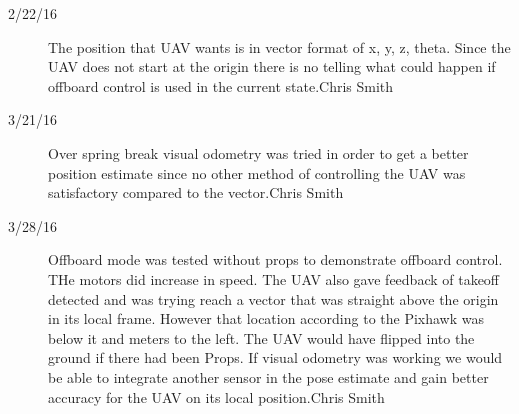 \begin{description}
\item [2/22/16]  The position that UAV wants is in vector format of x, y, z, theta. Since the UAV does not start at the origin there is no telling what could happen if offboard control is used in the current state.\hfill{Chris Smith}

\item [3/21/16]  Over spring break visual odometry was tried in order to get a better position estimate since no other method of controlling the UAV was satisfactory compared to the vector.\hfill{Chris Smith}

\item [3/28/16]  Offboard mode was tested without props to demonstrate offboard control. THe motors did increase in speed. The  UAV also gave feedback of takeoff detected and was trying reach a vector that was straight above the origin in its local frame. However that location according to the Pixhawk was below it and meters to the left. The UAV would have flipped into the ground if there had been Props. If visual odometry was working we would be able to integrate another sensor in the pose estimate and gain better accuracy for the UAV on its local position.\hfill{Chris Smith}
\end{description}
